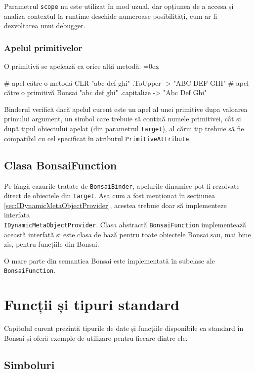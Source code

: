 \documentclass[12pt,a4paper]{memoir}
\renewcommand{\c}{\texttt}
\newenvironment{code}
{
\definecolor{shadecolor}{gray}{0.91}
\topsep=0ex
\relax
\shaded
\verbatim
}
{
\endverbatim
\endshaded
}
\begin{document}
Parametrul \c{scope} nu este utilizat în mod uzual, dar opțiunea de a accesa și analiza contextul la runtime deschide numeroase posibilități, cum ar fi dezvoltarea unui debugger.

\subsection{Apelul primitivelor}

O primitivă se apelează ca orice altă metodă:
\begin{code}
# apel către o metodă CLR
"abc def ghi" .ToUpper
  -> "ABC DEF GHI"
# apel către o primitivă Bonsai
"abc def ghi" .capitalize
  -> "Abc Def Ghi"
\end{code}

Binderul verifică dacă apelul curent este un apel al unei primitive dupa valoarea primului argument, un simbol care trebuie să conțină numele primitivei, cât și după tipul obiectului apelat (din parametrul \c{target}), al cărui tip trebuie să fie compatibil cu cel specificat în atributul \c{PrimitiveAttribute}.

\section{Clasa BonsaiFunction}

Pe lângă cazurile tratate de \c{BonsaiBinder}, apelurile dinamice pot fi rezolvate direct de obiectele din \c{target}. Așa cum a fost menționat în secțiunea \ref{sec:IDynamicMetaObjectProvider}, acestea trebuie doar să implementeze interfața\\ \c{IDynamicMetaObjectProvider}. Clasa abstractă \c{BonsaiFunction} implementează această interfață și este clasa de bază pentru toate obiectele Bonsai sau, mai bine zis, pentru funcțiile din Bonsai.

O mare parte din semantica Bonsai este implementată în subclase ale \c{BonsaiFunction}. 

\chapter{Funcții și tipuri standard}

Capitolul curent prezintă tipurile de date și funcțiile disponibile ca standard în Bonsai și oferă exemple de utilizare pentru fiecare dintre ele.

\section{Simboluri}
\end{document}
